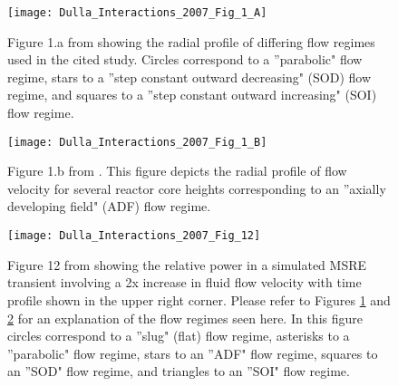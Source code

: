 \documentclass[review]{elsarticle}
\begin{document}
\begin{figure}[H]
   \centering
   \texttt{[image: Dulla\_Interactions\_2007\_Fig\_1\_A]}
   \caption{Figure 1.a from \cite{dulla_interactions_2007} showing the radial profile of
   differing flow regimes used in the cited study. Circles correspond
    to a ''parabolic" flow regime, stars to a ''step constant outward
     decreasing"
    (SOD) flow regime, and squares to a ''step constant outward increasing"
     (SOI)
    flow regime.} 
   \label{fig:dulla_flow_map}
\end{figure}

\begin{figure}[H]
   \centering
   \texttt{[image: Dulla\_Interactions\_2007\_Fig\_1\_B]}
   \caption{Figure 1.b from \cite{dulla_interactions_2007}.
   This figure depicts
   the radial profile of flow velocity for several reactor core heights
   corresponding to an ''axially developing field" (ADF) flow regime.} 
   \label{fig:dulla_flow_adf}
\end{figure}

\begin{figure}[H]
   \centering
   \texttt{[image: Dulla\_Interactions\_2007\_Fig\_12]}
   \caption{Figure 12 from \cite{dulla_interactions_2007} showing the relative power in a
   simulated MSRE transient involving a 2x increase in fluid flow velocity with time profile
   shown in the upper right corner. Please refer to
   Figures \ref{fig:dulla_flow_map} and \ref{fig:dulla_flow_adf} for an
   explanation of the flow regimes seen here. In this figure circles correspond
   to a ''slug" (flat) flow regime, asterisks to a ''parabolic" flow regime,
   stars to an
   ''ADF" flow regime, squares to an ''SOD" flow regime, and triangles to an
   ''SOI" flow regime.} 
   \label{fig:dulla_flow_regimes}
\end{figure}
\end{document}
